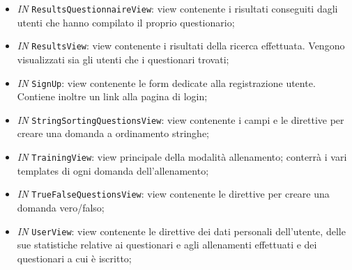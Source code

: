 \begin{itemize}
\begin{itemize}
			\item \textit{IN} \texttt{ResultsQuestionnaireView}: view contenente i risultati conseguiti dagli utenti che hanno compilato il proprio questionario;
			\item \textit{IN} \texttt{ResultsView}: view contenente i risultati della ricerca effettuata. Vengono visualizzati sia gli utenti che i questionari trovati;
			\item \textit{IN} \texttt{SignUp}:  view contenente le form dedicate alla registrazione utente. Contiene inoltre un link alla pagina di login;
			\item \textit{IN} \texttt{StringSortingQuestionsView}:  view contenente i campi e le direttive per creare una domanda a ordinamento stringhe; 
			\item \textit{IN} \texttt{TrainingView}: view principale della modalità allenamento; conterrà i vari templates di ogni domanda dell'allenamento;
			\item \textit{IN} \texttt{TrueFalseQuestionsView}: view contenente le direttive per creare una domanda vero/falso;
			\item \textit{IN} \texttt{UserView}:  view contenente le direttive dei dati personali dell'utente, delle sue statistiche relative ai questionari e agli allenamenti effettuati e dei questionari a cui è iscritto;
		\end{itemize}
	\end{itemize}

